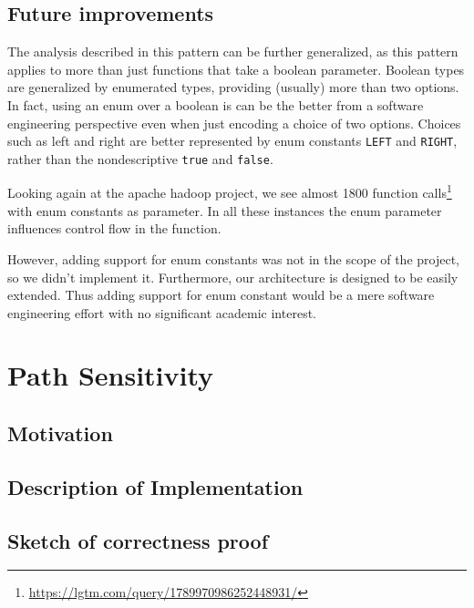 \subsection{Future improvements}
The analysis described in this pattern can be further generalized, as
this pattern applies to more than just functions that take a boolean parameter.
Boolean types are generalized by enumerated types, providing (usually) more than two options.
In fact, using an enum over a boolean is can be the better from a software engineering perspective
even when just encoding a choice of two options.
Choices such as left and right are better represented 
by enum constants \texttt{LEFT} and \texttt{RIGHT}, rather than the 
nondescriptive \texttt{true} and \texttt{false}.

Looking again at the apache hadoop project, we see almost 1800
function calls\footnote{\url{https://lgtm.com/query/1789970986252448931/}} with enum constants as parameter.
In all these instances the enum parameter influences control flow in the function.

However, adding support for enum constants was not in the scope of the project, so we didn't implement it.
Furthermore, our architecture is designed to be easily extended.
Thus adding support for enum constant would be a mere software engineering effort
with no significant academic interest.


\newpage
\section{Path Sensitivity}
\subsection{Motivation}
\subsection{Description of Implementation}
\subsection{Sketch of correctness proof}




